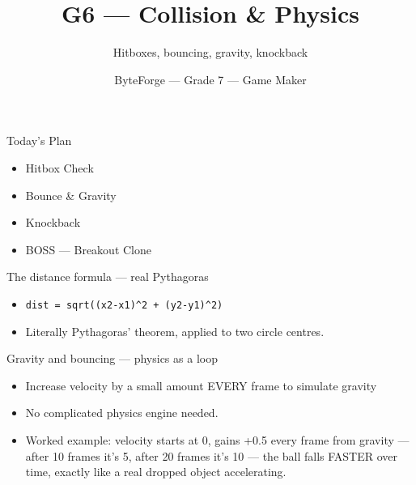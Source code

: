 \documentclass[aspectratio=169]{beamer}
\title{G6 — Collision \& Physics}
\subtitle{Hitboxes, bouncing, gravity, knockback}
\author{ByteForge --- Grade 7 --- Game Maker}
\date{}
\begin{document}
\begin{frame}
    \titlepage
\end{frame}

\begin{frame}{Today's Plan}
    \begin{itemize}
        \item Hitbox Check
        \item Bounce \& Gravity
        \item Knockback
        \item[$\bigstar$] BOSS --- Breakout Clone
    \end{itemize}
\end{frame}

\begin{frame}{The distance formula — real Pythagoras}
    \large
    \begin{itemize}
        \item \texttt{dist = sqrt((x2-x1)\textasciicircum{}2 + (y2-y1)\textasciicircum{}2)}
        \item Literally Pythagoras' theorem, applied to two circle centres.
    \end{itemize}

    \begin{center}
    \end{center}
\end{frame}


\begin{frame}{Gravity and bouncing — physics as a loop}
    \large
    \begin{itemize}
        \item Increase velocity by a small amount EVERY frame to simulate gravity
        \item No complicated physics engine needed.
        \item Worked example: velocity starts at 0, gains +0.5 every frame from gravity — after 10 frames it's 5, after 20 frames it's 10 — the ball falls FASTER over time, exactly like a real dropped object accelerating.
    \end{itemize}
\end{frame}
\end{document}
